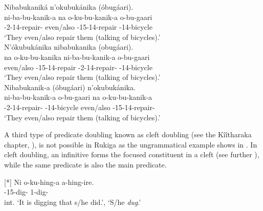 \documentclass[output=paper]{langscibook}
\begin{document}
\ex
Nibabukaniká n’okubukánika (óbugáari).\\
\gll
ni-ba-bu-kanik-a  na  o-ku-bu-kanik-a o-bu-gaari\\
\IPFV{}-2\SM{}-14\OM{}-repair-\FV{}  even/also  \AUG{}-15-14\OM{}-repair \AUG{}-14-bicycle\\
\glt
‘They even/also repair them (talking of bicycles).’\\


\ex
N’ókubukánika nibabukanika (obugáari).\\
\gll
na  o-ku-bu-kanika  ni-ba-bu-kanik-a  o-bu-gaari\\
even/also  \AUG{}-15-14\OM{}-repair  \IPFV{}-2\SM{}-14\OM{}-repair-\FV{} \AUG{}-14-bicycle\\
\glt
‘They even/also repair them (talking of bicycles).’\\

\ex   
Nibabukanik-a (óbugáari) n’okubukánika.\\
\gll
  ni-ba-bu-kanik-a  o-bu-gaari na  o-ku-bu-kanik-a\\
  \IPFV{}-2\SM{}-14-repair-\FV{}  \AUG{}-14-bicycle even/also  \AUG{}-15-14-repair-\FV{}\\
\glt `They even/also repair them (talking of bicycles).’\\


\z

\z


A third type of predicate doubling known as cleft doubling (see the Kîîtharaka chapter, ), is not possible in Rukiga as the ungrammatical example shows in . In cleft doubling, an infinitive forms the focused constituent in a cleft (see further ), while the same predicate is also the main predicate.

\ea
[*]{
\label{bkm:Ref127994561}
\gll
Ni  o-ku-hing-a  a-hing-ire.\\
\COP{}  \AUG{}-{}15-dig-\FV{}  1\SM{}-{}dig-\PFV{}\\
\glt
int. ‘It is digging that s/he did.’, ‘S/he \textit{dug}.’\\
}


\z
\end{document}
